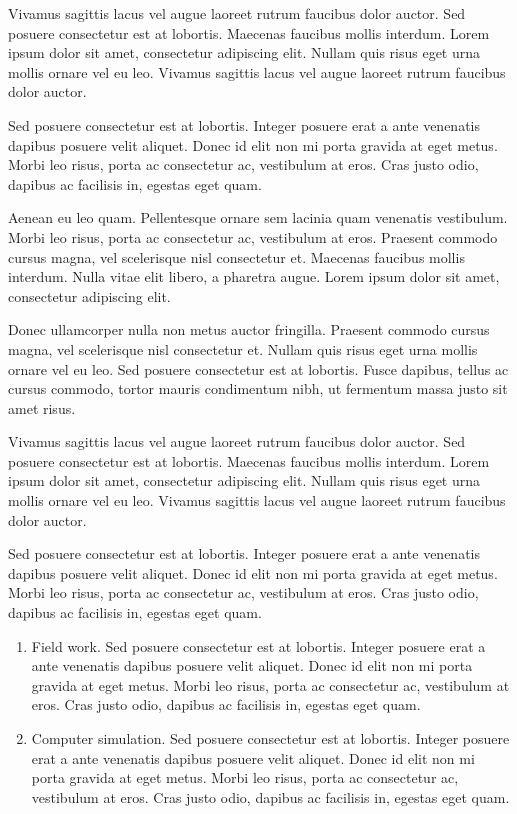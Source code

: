 \documentclass[journal]{../template/IEEEtran}
\begin{document}
Vivamus sagittis lacus vel augue laoreet rutrum faucibus dolor auctor. Sed posuere consectetur est at lobortis. Maecenas faucibus mollis interdum. Lorem ipsum dolor sit amet, consectetur adipiscing elit. Nullam quis risus eget urna mollis ornare vel eu leo. Vivamus sagittis lacus vel augue laoreet rutrum faucibus dolor auctor.

Sed posuere consectetur est at lobortis. Integer posuere erat a ante venenatis dapibus posuere velit aliquet. Donec id elit non mi porta gravida at eget metus. Morbi leo risus, porta ac consectetur ac, vestibulum at eros. Cras justo odio, dapibus ac facilisis in, egestas eget quam.

Aenean eu leo quam. Pellentesque ornare sem lacinia quam venenatis vestibulum. Morbi leo risus, porta ac consectetur ac, vestibulum at eros. Praesent commodo cursus magna, vel scelerisque nisl consectetur et. Maecenas faucibus mollis interdum. Nulla vitae elit libero, a pharetra augue. Lorem ipsum dolor sit amet, consectetur adipiscing elit.

Donec ullamcorper nulla non metus auctor fringilla. Praesent commodo cursus magna, vel scelerisque nisl consectetur et. Nullam quis risus eget urna mollis ornare vel eu leo. Sed posuere consectetur est at lobortis. Fusce dapibus, tellus ac cursus commodo, tortor mauris condimentum nibh, ut fermentum massa justo sit amet risus.

Vivamus sagittis lacus vel augue laoreet rutrum faucibus dolor auctor. Sed posuere consectetur est at lobortis. Maecenas faucibus mollis interdum. Lorem ipsum dolor sit amet, consectetur adipiscing elit. Nullam quis risus eget urna mollis ornare vel eu leo. Vivamus sagittis lacus vel augue laoreet rutrum faucibus dolor auctor.

Sed posuere consectetur est at lobortis. Integer posuere erat a ante venenatis dapibus posuere velit aliquet. Donec id elit non mi porta gravida at eget metus. Morbi leo risus, porta ac consectetur ac, vestibulum at eros. Cras justo odio, dapibus ac facilisis in, egestas eget quam.

\begin{enumerate}
	\item{Field work.} Sed posuere consectetur est at lobortis. Integer posuere erat a ante venenatis dapibus posuere velit aliquet. Donec id elit non mi porta gravida at eget metus. Morbi leo risus, porta ac consectetur ac, vestibulum at eros. Cras justo odio, dapibus ac facilisis in, egestas eget quam.
	\item{Computer simulation.} Sed posuere consectetur est at lobortis. Integer posuere erat a ante venenatis dapibus posuere velit aliquet. Donec id elit non mi porta gravida at eget metus. Morbi leo risus, porta ac consectetur ac, vestibulum at eros. Cras justo odio, dapibus ac facilisis in, egestas eget quam.
\end{enumerate}
\end{document}
